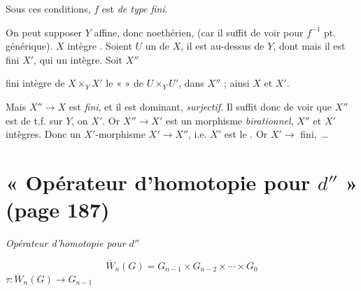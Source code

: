 \documentclass[11pt,a4paper]{article}
\begin{document}
Sous ces conditions, $f$ est \emph{de type fini}.

On peut supposer  $Y$ affine, donc noethérien, \ill{} (car il
suffit de voir pour $f^{-1}$  pt. générique). $X$ intègre
. Soient $U$ un \ill{} de $X$, il est \ill{} au-dessus
de $Y$, dont \ill{} mais \ill{} il est  \ill{} fini
$X'$, qui \ill{} un \ill{} intègre. Soit $X''$ \ill{}



\ill{} fini intègre de $X \times_Y X'$  \ill{} le
« \ill{} » de $U \times_Y U'$, dans $X''$ ; ainsi \ill{}  $X$
et $X'$.


Mais $X'' \to X$ est \emph{fini}, et il est dominant, 
\emph{surjectif}. Il suffit donc de voir que $X''$ est de t.f. sur $Y$, on
\ill{}  $X'$. Or $X'' \to X'$ est un morphisme
\emph{birationnel}, \ill{} $X''$ et $X'$ intègres. Donc  un
$X'$-morphisme  $X' \to X''$, i.e. $X'$ est le
. Or $X' \to$ \ill{} fini, \ill{} \ill{}\,\ldots

\section*{« Opérateur d'homotopie pour $d''$ » (page 187)}



\emph{Opérateur d'homotopie pour $d''$}

\[
  \overline{W}_n(G) = G_{n-1} \times G_{n-2} \times \cdots \times G_0
\]
 \quad $\tau : \overline{W}_n(G) \longrightarrow G_{n-1}$
\end{document}
